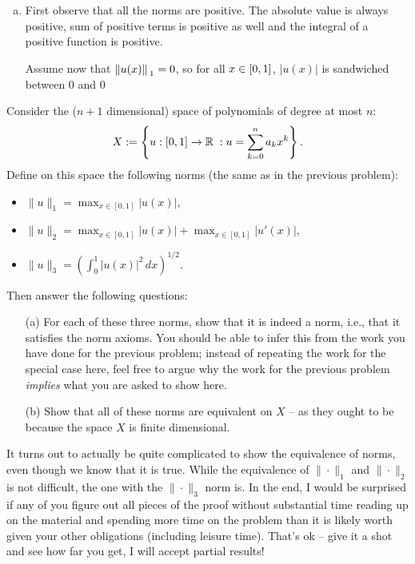 \documentclass[12pt]{memoir}
\begin{document}
\begin{ptcbr}
\begin{enumerate}[(a)]
    \item First observe that all the norms are positive. The absolute value is always positive, sum of positive terms is positive as well and the integral of a positive function is positive.\par 
    Assume now that $\norm*{u(x)}_1=0$, so for all $x\in\left\lbrack0,1\right\rbrack$, $|u(x)|$ is sandwiched between $0$ and $0$
\end{enumerate}
\end{ptcbr}
\begin{Ej}
    Consider the ($n+1$ dimensional) space of polynomials of degree at most $n$:
\begin{align*}
  X := \left\{ 
   u : [0,1] \rightarrow \mathbb{R} \; :
   u=\sum_{k=0}^n a_k x^k
  \right\}.
\end{align*}
Define on this space the following norms (the same as in the previous problem):
\begin{itemize}
\item $\|u\|_1 = \max_{x \in [0,1]} |u(x)|$,
\item $\|u\|_2 = \max_{x \in [0,1]} |u(x)| + \max_{x \in [0,1]}
  |u'(x)|$,
\item $\|u\|_3 = \left(\int_0^1 |u(x)|^2 \, dx\right)^{1/2}$.
\end{itemize}
Then answer the following questions:
\begin{itemize}
\item[(a)] For each of these three norms, show that it is indeed a
  norm, i.e., that it satisfies the norm axioms. You should be able to
  infer this from the work you have done for the previous problem;
  instead of repeating the work for the special case here, feel free
  to argue why the work for the previous problem \textit{implies} what you are
  asked to show here.
\item[(b)] Show that all of these norms are equivalent on $X$ -- as they
  ought to be because the space $X$ is finite dimensional.
\end{itemize}

\end{Ej}
\begin{nonum-Rmk}
    It turns out to actually be quite complicated to
  show the equivalence of norms, even though we know that it is true. While the equivalence of
  $\|\cdot\|_1$ and  $\|\cdot\|_2$ is not difficult, the one with the
  $\|\cdot\|_3$ norm is. In the end, I would be surprised if any of you figure
  out all pieces of the proof without substantial time reading up on
  the material and spending more time on the problem than it is likely
  worth given your other obligations (including leisure time). That's
  ok -- give it a shot and see how far you get, I will accept partial results!
\end{nonum-Rmk}
\end{document}
